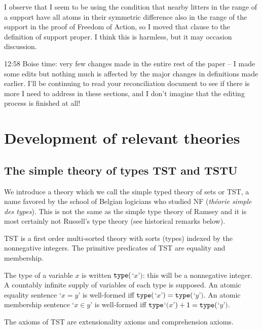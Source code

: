 \documentclass[112pt]{article}
\begin{document}
\begin{description}
I observe that I seem to be using the condition that nearby litters in the range of a support have all atoms in their symmetric difference also in the range of the support in the proof of Freedom of Action, so I moved that clause to the definition of support proper.  I think this is harmless, but it may occasion discussion.

12:58 Boise time:  very few changes made in the entire rest of the paper -- I made some edits but nothing much is affected by the major changes in definitions made earlier.  I'll be continuing to read your reconciliation document to see if there is more I need to address in these sections, and I don't imagine that the editing process is finished at all!

\end{description}


\newpage

\section{Development of relevant theories}



\subsection{The simple theory of types TST and TSTU}

We introduce a theory which we call the simple typed theory of sets or TST, a name favored by the school of Belgian logicians who studied NF ({\em th\'eorie simple des types}).  This is not the same as the simple type theory of Ramsey and it is most certainly not Russell's type theory  (see historical remarks below).

TST is a first order multi-sorted theory with sorts (types) indexed by the nonnegative integers.  The primitive predicates of TST are equality and membership.

The type of a variable $x$ is written ${\tt type}($`$x$'$)$:  this will be a nonnegative integer.   A countably infinite supply of variables of each type is supposed.  An atomic equality sentence `$x=y$' is well-formed iff ${\tt type}($`$x$'$)={\tt type}($`$y$'$)$.
An atomic membership sentence `$x \in y$' is well-formed iff ${\tt type}$`$(x$'$)+1 = {\tt type}($`$y$'$)$.

The axioms of TST are extensionality axioms and comprehension axioms.
\end{document}
